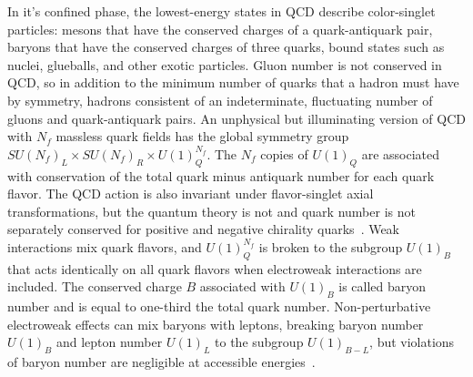 In it's confined phase, the lowest-energy states in QCD describe color-singlet particles:
mesons that have the conserved charges of a quark-antiquark pair,
baryons that have the conserved charges of three quarks,
bound states such as nuclei,
glueballs,
and other exotic particles.
Gluon number is not conserved in QCD, so in addition to the minimum number of quarks that a hadron must have by symmetry, 
hadrons consistent of an indeterminate, fluctuating number of gluons and quark-antiquark pairs.
An unphysical but illuminating version of QCD with $N_f$ massless quark fields has the global symmetry group $SU(N_f)_L\times SU(N_f)_R\times U(1)_Q^{N_f}$.
The $N_f$ copies of $U(1)_Q$ are associated with conservation of the total quark minus antiquark number for each quark flavor.
The QCD action is also invariant under flavor-singlet axial transformations, but the quantum theory is not and quark number is not separately conserved for positive and negative chirality quarks~\cite{Adler:1969gk,Bell:1969ts}.
Weak interactions mix quark flavors, and $U(1)_Q^{N_f}$ is broken to the subgroup $U(1)_B$ that acts identically on all quark flavors when electroweak interactions are included.
The conserved charge $B$ associated with $U(1)_B$ is called baryon number and is equal to one-third the total quark number.
Non-perturbative electroweak effects can mix baryons with leptons, breaking baryon number $U(1)_B$ and lepton number $U(1)_L$ to the subgroup $U(1)_{B-L}$, but violations of baryon number are negligible at accessible energies~\cite{tHooft:1976up}.

